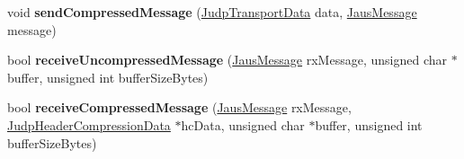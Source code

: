 \begin{DoxyCompactItemize}
\item 
\hypertarget{class_judp_interface_a8047a995005c2910864dabdef77b4a2d}{void {\bfseries send\-Compressed\-Message} (\hyperlink{struct_judp_transport_data}{\-Judp\-Transport\-Data} data, \hyperlink{struct_jaus_message_struct}{\-Jaus\-Message} message)}\label{class_judp_interface_a8047a995005c2910864dabdef77b4a2d}

\item 
\hypertarget{class_judp_interface_a02142e48953c575e57c736348795deb6}{bool {\bfseries receive\-Uncompressed\-Message} (\hyperlink{struct_jaus_message_struct}{\-Jaus\-Message} rx\-Message, unsigned char $\ast$buffer, unsigned int buffer\-Size\-Bytes)}\label{class_judp_interface_a02142e48953c575e57c736348795deb6}

\item 
\hypertarget{class_judp_interface_a71c9845bde636d16ca7ea197d84733e0}{bool {\bfseries receive\-Compressed\-Message} (\hyperlink{struct_jaus_message_struct}{\-Jaus\-Message} rx\-Message, \hyperlink{struct_judp_header_compression_data}{\-Judp\-Header\-Compression\-Data} $\ast$hc\-Data, unsigned char $\ast$buffer, unsigned int buffer\-Size\-Bytes)}\label{class_judp_interface_a71c9845bde636d16ca7ea197d84733e0}

\end{DoxyCompactItemize}
